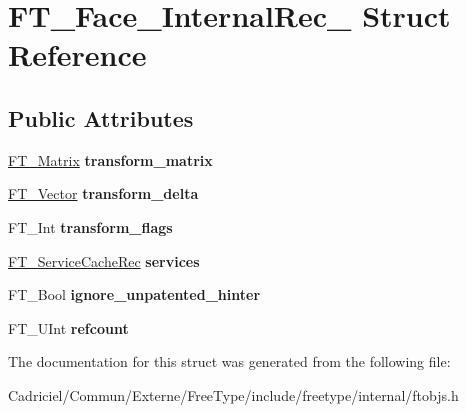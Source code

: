 \hypertarget{struct_f_t___face___internal_rec__}{\section{F\-T\-\_\-\-Face\-\_\-\-Internal\-Rec\-\_\- Struct Reference}
\label{struct_f_t___face___internal_rec__}
}
\subsection*{Public Attributes}
\begin{DoxyCompactItemize}
\item 
\hypertarget{struct_f_t___face___internal_rec___ab4be2dcda098e6136f5701580d18032d}{\hyperlink{struct_f_t___matrix__}{F\-T\-\_\-\-Matrix} {\bfseries transform\-\_\-matrix}}\label{struct_f_t___face___internal_rec___ab4be2dcda098e6136f5701580d18032d}

\item 
\hypertarget{struct_f_t___face___internal_rec___ab6c2aacdac58312273395b21b8d168c6}{\hyperlink{struct_f_t___vector__}{F\-T\-\_\-\-Vector} {\bfseries transform\-\_\-delta}}\label{struct_f_t___face___internal_rec___ab6c2aacdac58312273395b21b8d168c6}

\item 
\hypertarget{struct_f_t___face___internal_rec___a2495aced35040e1b7c2bc0afcd7a920d}{F\-T\-\_\-\-Int {\bfseries transform\-\_\-flags}}\label{struct_f_t___face___internal_rec___a2495aced35040e1b7c2bc0afcd7a920d}

\item 
\hypertarget{struct_f_t___face___internal_rec___abc3acb3bf5db056bb9c549af04f07963}{\hyperlink{struct_f_t___service_cache_rec__}{F\-T\-\_\-\-Service\-Cache\-Rec} {\bfseries services}}\label{struct_f_t___face___internal_rec___abc3acb3bf5db056bb9c549af04f07963}

\item 
\hypertarget{struct_f_t___face___internal_rec___af898fd754c36c3f34c9ce0e88eb101c9}{F\-T\-\_\-\-Bool {\bfseries ignore\-\_\-unpatented\-\_\-hinter}}\label{struct_f_t___face___internal_rec___af898fd754c36c3f34c9ce0e88eb101c9}

\item 
\hypertarget{struct_f_t___face___internal_rec___a05d49c857c024a50441e17899803f56c}{F\-T\-\_\-\-U\-Int {\bfseries refcount}}\label{struct_f_t___face___internal_rec___a05d49c857c024a50441e17899803f56c}

\end{DoxyCompactItemize}


The documentation for this struct was generated from the following file\-:\begin{DoxyCompactItemize}
\item 
Cadriciel/\-Commun/\-Externe/\-Free\-Type/include/freetype/internal/ftobjs.\-h\end{DoxyCompactItemize}
